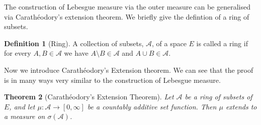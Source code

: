 \documentclass[11pt]{article}
\newtheorem{thm}{Theorem}[section]
\theoremstyle{definition}
\newtheorem{dfn}[thm]{Definition}
\theoremstyle{remark}
\begin{document}
The construction of Lebesgue measure via the outer measure can be generalised via Carath\'eodory's extension theorem. We briefly give the defintion of a ring of subsets.
\begin{dfn}[Ring]
A collection of subsets, $\mathcal{A}$, of a space $E$ is called a ring if for every $A,B \in \mathcal{A}$ we have $A \setminus B \in \mathcal{A}$ and $A \cup B \in \mathcal{A}$.
\end{dfn}
Now we introduce Carath\'eodory's Extension theorem. We can see that the proof is in many ways very similar to the construction of Lebesgue measure. 
\begin{thm}[Carath\'eodory's Extension Theorem]
Let $\mathcal{A}$ be a ring of subsets of $E$, and let $\mu: \mathcal{A} \rightarrow [0, \infty]$ be a countably additive set function. Then $\mu$ extends to a measure on $\sigma(\mathcal{A})$.
\end{thm}
\end{document}
